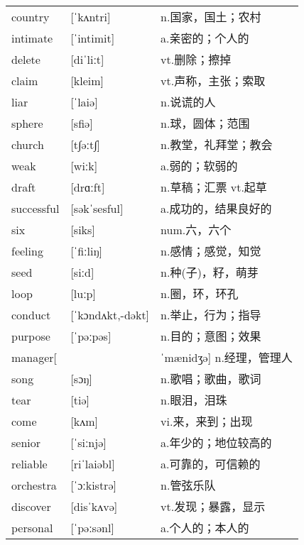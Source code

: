 \documentclass[a4paper]{article}
\begin{document}
\section{}
\begin{tabular}{l l l}

country & [ˈkʌntri] & n.国家，国土；农村 \\
intimate & [ˈintimit] & a.亲密的；个人的 \\
delete & [diˈliːt] & vt.删除；擦掉 \\
claim & [kleim] & vt.声称，主张；索取 \\
liar & [ˈlaiə] & n.说谎的人 \\
sphere & [sfiə] & n.球，圆体；范围 \\
church & [t∫əːt∫] & n.教堂，礼拜堂；教会 \\
weak & [wiːk] & a.弱的；软弱的 \\
draft & [drɑːft] & n.草稿；汇票 vt.起草 \\
successful & [səkˈsesful] & a.成功的，结果良好的 \\
six & [siks] & num.六，六个 \\
feeling & [ˈfiːliŋ] & n.感情；感觉，知觉 \\
seed & [siːd] & n.种(子)，籽，萌芽 \\
loop & [luːp] & n.圈，环，环孔 \\
conduct & [ˈkɔndʌkt,-dəkt] & n.举止，行为；指导 \\
purpose & [ˈpəːpəs] & n.目的；意图；效果 \\
manager[ &  & ˈmænidʒə] n.经理，管理人 \\
song & [sɔŋ] & n.歌唱；歌曲，歌词 \\
tear & [tiə] & n.眼泪，泪珠 \\
come & [kʌm] & vi.来，来到；出现 \\
senior & [ˈsiːnjə] & a.年少的；地位较高的 \\
reliable & [riˈlaiəbl] & a.可靠的，可信赖的 \\
orchestra & [ˈɔːkistrə] & n.管弦乐队 \\
discover & [disˈkʌvə] & vt.发现；暴露，显示 \\
personal & [ˈpəːsənl] & a.个人的；本人的 \\

\end{tabular}
\end{document}
